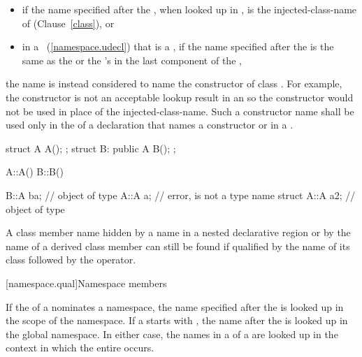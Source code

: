 \begin{itemize}
\item if the name specified after the ,
when looked up in , is the injected-class-name of  (Clause~\ref{class}), or
\item
in a ~(\ref{namespace.udecl}) that is a ,
if the name specified after the  is the same as the
 or the 's
 in the last component of the ,
\end{itemize}
the name is instead considered to name the
constructor of class . \enternote For example, the constructor
is not an acceptable lookup result in an
 so the constructor would not be
used in place of the injected-class-name. \exitnote Such a constructor
name shall be used only in the  of a declaration
that names a constructor or in a . \enterexample

\begin{codeblock}
struct A { A(); };
struct B: public A { B(); };

A::A() { }
B::B() { }

B::A ba;            // object of type 
A::A a;             // error,  is not a type name
struct A::A a2;     // object of type 
\end{codeblock}
\exitexample 

\pnum
A class member name hidden by a name in a nested declarative region or
by the name of a derived class member can still be found if qualified by
the name of its class followed by the \tcode{::} operator.

[namespace.qual]{Namespace members}

\pnum
{}%
If the  of a 
nominates a namespace, the name specified after the
 is looked up in the scope of the
namespace.
If a  starts with \tcode{::}, the name after the
\tcode{::} is looked up in the global namespace. In either case,
the names in a  of a
 are looked up in the context in which the
entire  occurs.

